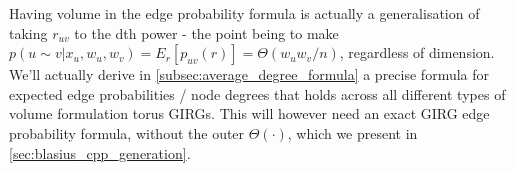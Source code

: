 Having volume in the edge probability formula is actually a generalisation of taking $r_{uv}$ to the dth power - the point being to make $p(u \sim v | x_u, w_u, w_v) = E_r[p_{uv}(r)] = \Theta(w_u w_v/n)$, regardless of dimension. We'll actually derive in \cref{subsec:average_degree_formula} a precise formula for expected edge probabilities / node degrees that holds across all different types of volume formulation torus GIRGs. This will however need an exact GIRG edge probability formula, without the outer $\Theta ( \cdot )$, which we present in \cref{sec:blasius_cpp_generation}.





